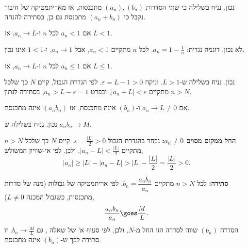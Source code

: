 \begin{solbox}
    נכון. נניח בשלילה כי שתי הסדרות
    $(a_n),(b_n)$
    מתכנסות, אז מאריתמטיקה של חיבור נקבל כי
    $(a_n+b_n)$
    מתכנסת גם כן, בסתירה להנחה.
\end{solbox}
    \item
    אם
    $a_n<1$
    לכל $n$ ו-$a_n\to L$, אז
    $L<1$.
    \begin{solbox}
לא נכון. דוגמה נגדית:
$a_n=1-\frac1n$.
לכל $n$ מתקיים
$a_n<1$,
אבל
$a_n\to1$,
ו-$1<1$ אינו נכון.
\end{solbox}
    \item
    אם
    $a_n\le1$
    לכל $n$ ו-$a_n\to L$, אז
    $L\le1$.
    \begin{solbox}
נכון. נניח בשלילה ש-$L>1$, וניקח
$\varepsilon=L-1>0$.
לפי הגדרת הגבול, קיים $N$ כך שלכל $n>N$ מתקיים
$|a_n-L|<\varepsilon$,
ובפרט
$a_n>L-\varepsilon=1$,
בסתירה לנתון.
\end{solbox}
    \item
    אם
    $a_n\to L\ne0$
    ו-$(b_n)$
    אינה מתכנסת, אז
    $(a_nb_n)$
    אינה מתכנסת.
\begin{solbox}
נכון. נניח בשלילה ש-$a_nb_n\to M$.

\textbf{החל ממקום מסוים $a_n\ne0$:}
נבחר בהגדרת הגבול
$\varepsilon=\frac{|L|}{2}>0$.
קיים
$N$
כך שלכל
$n>N$
מתקיים
$|a_n-L|<\frac{|L|}2$,
ולכן, לפי אי-שוויון המשולש,
$$|a_n|\ge|L|-|a_n-L|>|L|-\frac{|L|}2=\frac{|L|}2>0 .$$

\textbf{סתירה:}
לכל
$n>N$
מתקיים
$b_n=\dfrac{a_nb_n}{a_n}$.
לפי אריתמטיקה של גבולות (מנה של סדרות מתכנסות, כשגבול המכנה
$L\ne0$),
$$\frac{a_nb_n}{a_n}\goes\frac ML .$$
הסדרה
$(b_n)$
שווה לסדרה הזו החל מ-$N$, ולכן, לפי סעיף א' של שאלה
,
גם
$b_n\to\frac ML$.
זו סתירה לכך ש-$(b_n)$
אינה מתכנסת.
\end{solbox}
\eE
